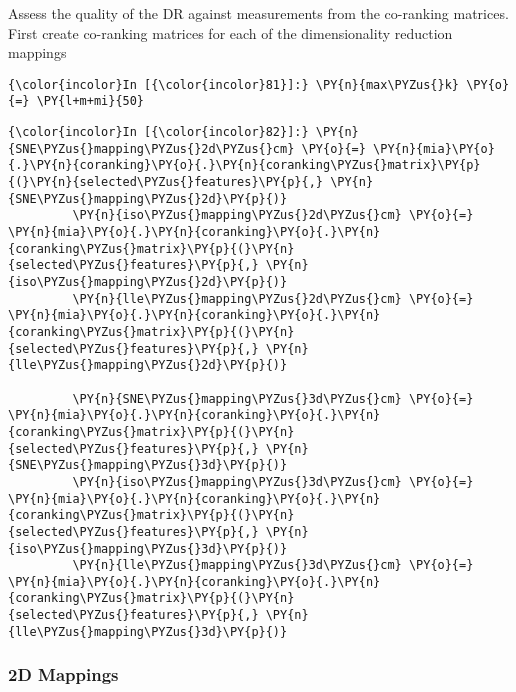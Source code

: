     Assess the quality of the DR against measurements from the co-ranking
matrices. First create co-ranking matrices for each of the
dimensionality reduction mappings

    \begin{Verbatim}[commandchars=\\\{\}]
{\color{incolor}In [{\color{incolor}81}]:} \PY{n}{max\PYZus{}k} \PY{o}{=} \PY{l+m+mi}{50}
\end{Verbatim}

    \begin{Verbatim}[commandchars=\\\{\}]
{\color{incolor}In [{\color{incolor}82}]:} \PY{n}{SNE\PYZus{}mapping\PYZus{}2d\PYZus{}cm} \PY{o}{=} \PY{n}{mia}\PY{o}{.}\PY{n}{coranking}\PY{o}{.}\PY{n}{coranking\PYZus{}matrix}\PY{p}{(}\PY{n}{selected\PYZus{}features}\PY{p}{,} \PY{n}{SNE\PYZus{}mapping\PYZus{}2d}\PY{p}{)}
         \PY{n}{iso\PYZus{}mapping\PYZus{}2d\PYZus{}cm} \PY{o}{=} \PY{n}{mia}\PY{o}{.}\PY{n}{coranking}\PY{o}{.}\PY{n}{coranking\PYZus{}matrix}\PY{p}{(}\PY{n}{selected\PYZus{}features}\PY{p}{,} \PY{n}{iso\PYZus{}mapping\PYZus{}2d}\PY{p}{)}
         \PY{n}{lle\PYZus{}mapping\PYZus{}2d\PYZus{}cm} \PY{o}{=} \PY{n}{mia}\PY{o}{.}\PY{n}{coranking}\PY{o}{.}\PY{n}{coranking\PYZus{}matrix}\PY{p}{(}\PY{n}{selected\PYZus{}features}\PY{p}{,} \PY{n}{lle\PYZus{}mapping\PYZus{}2d}\PY{p}{)}

         \PY{n}{SNE\PYZus{}mapping\PYZus{}3d\PYZus{}cm} \PY{o}{=} \PY{n}{mia}\PY{o}{.}\PY{n}{coranking}\PY{o}{.}\PY{n}{coranking\PYZus{}matrix}\PY{p}{(}\PY{n}{selected\PYZus{}features}\PY{p}{,} \PY{n}{SNE\PYZus{}mapping\PYZus{}3d}\PY{p}{)}
         \PY{n}{iso\PYZus{}mapping\PYZus{}3d\PYZus{}cm} \PY{o}{=} \PY{n}{mia}\PY{o}{.}\PY{n}{coranking}\PY{o}{.}\PY{n}{coranking\PYZus{}matrix}\PY{p}{(}\PY{n}{selected\PYZus{}features}\PY{p}{,} \PY{n}{iso\PYZus{}mapping\PYZus{}3d}\PY{p}{)}
         \PY{n}{lle\PYZus{}mapping\PYZus{}3d\PYZus{}cm} \PY{o}{=} \PY{n}{mia}\PY{o}{.}\PY{n}{coranking}\PY{o}{.}\PY{n}{coranking\PYZus{}matrix}\PY{p}{(}\PY{n}{selected\PYZus{}features}\PY{p}{,} \PY{n}{lle\PYZus{}mapping\PYZus{}3d}\PY{p}{)}
\end{Verbatim}

    \subsubsection{2D Mappings}\label{d-mappings}

